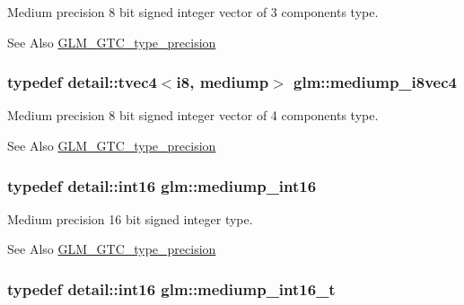 Medium precision 8 bit signed integer vector of 3 components type. \begin{DoxySeeAlso}{See Also}
\hyperlink{group__gtc__type__precision}{G\-L\-M\-\_\-\-G\-T\-C\-\_\-type\-\_\-precision} 
\end{DoxySeeAlso}
\hypertarget{group__gtc__type__precision_gad41bf4bfa504dc1191623ff77151d01f}{
\subsubsection[{mediump\-\_\-i8vec4}]{\setlength{\rightskip}{0pt plus 5cm}typedef detail\-::tvec4$<$i8, mediump$>$ {\bf glm\-::mediump\-\_\-i8vec4}}}\label{group__gtc__type__precision_gad41bf4bfa504dc1191623ff77151d01f}
Medium precision 8 bit signed integer vector of 4 components type. \begin{DoxySeeAlso}{See Also}
\hyperlink{group__gtc__type__precision}{G\-L\-M\-\_\-\-G\-T\-C\-\_\-type\-\_\-precision} 
\end{DoxySeeAlso}
\hypertarget{group__gtc__type__precision_ga4611997edb6c61606daa11990cf08798}{
\subsubsection[{mediump\-\_\-int16}]{\setlength{\rightskip}{0pt plus 5cm}typedef detail\-::int16 {\bf glm\-::mediump\-\_\-int16}}}\label{group__gtc__type__precision_ga4611997edb6c61606daa11990cf08798}
Medium precision 16 bit signed integer type. \begin{DoxySeeAlso}{See Also}
\hyperlink{group__gtc__type__precision}{G\-L\-M\-\_\-\-G\-T\-C\-\_\-type\-\_\-precision} 
\end{DoxySeeAlso}
\hypertarget{group__gtc__type__precision_ga478fab608cf43040013d719a3e03b194}{
\subsubsection[{mediump\-\_\-int16\-\_\-t}]{\setlength{\rightskip}{0pt plus 5cm}typedef detail\-::int16 {\bf glm\-::mediump\-\_\-int16\-\_\-t}}}\label{group__gtc__type__precision_ga478fab608cf43040013d719a3e03b194}
